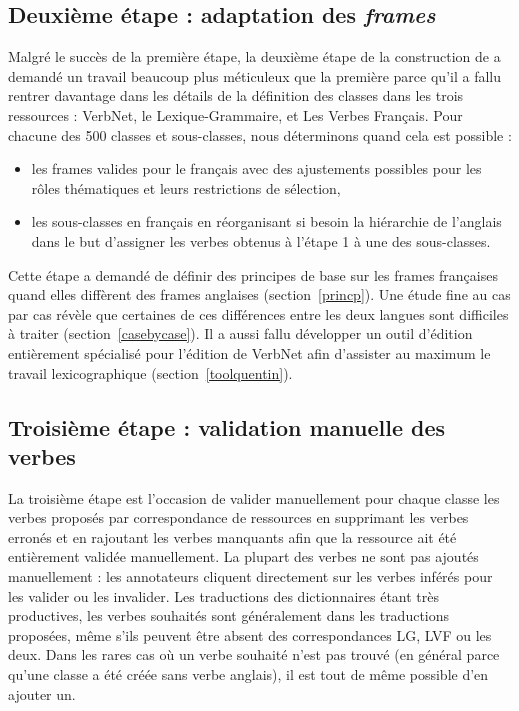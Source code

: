 \subsection{Deuxième étape : adaptation des \textit{frames}}\label{second}

Malgré le succès de la première étape, la deuxième étape de la construction de
\verbenet{} a demandé un travail beaucoup plus méticuleux que la première parce
qu'il a fallu rentrer davantage dans les détails de la définition des classes
dans les trois ressources : VerbNet, le Lexique-Grammaire, et Les Verbes
Français. Pour chacune des 500 classes et sous-classes, nous déterminons quand
cela est possible :

\begin{itemize}
    \item les frames valides pour le français avec des ajustements possibles
        pour les rôles thématiques et leurs restrictions de sélection,
    \item les sous-classes en français en réorganisant si besoin la hiérarchie
        de l'anglais dans le but d'assigner les verbes obtenus à l'étape 1 à
        une des sous-classes.
\end{itemize}

Cette étape a demandé de définir des principes de base sur les frames
françaises quand elles diffèrent des frames anglaises (section~\ref{princp}).
Une étude fine au cas par cas révèle que certaines de ces différences entre les
deux langues sont difficiles à traiter (section~\ref{casebycase}). Il a aussi
fallu développer un outil d'édition entièrement spécialisé pour l'édition de
VerbNet afin d'assister au maximum le travail lexicographique
(section~\ref{toolquentin}).

\subsection{Troisième étape : validation manuelle des verbes}
\label{third}

La troisième étape est l'occasion de valider manuellement pour chaque classe
les verbes proposés par correspondance de ressources en supprimant les verbes
erronés et en rajoutant les verbes manquants afin que la ressource ait été
entièrement validée manuellement. La plupart des verbes ne sont pas ajoutés
manuellement : les annotateurs cliquent directement sur les verbes inférés pour
les valider ou les invalider.  Les traductions des dictionnaires étant très
productives, les verbes souhaités sont généralement dans les traductions
proposées, même s'ils peuvent être absent des correspondances LG, LVF ou les
deux. Dans les rares cas où un verbe souhaité n'est pas trouvé (en général
parce qu'une classe a été créée sans verbe anglais), il est tout de même
possible d'en ajouter un.

